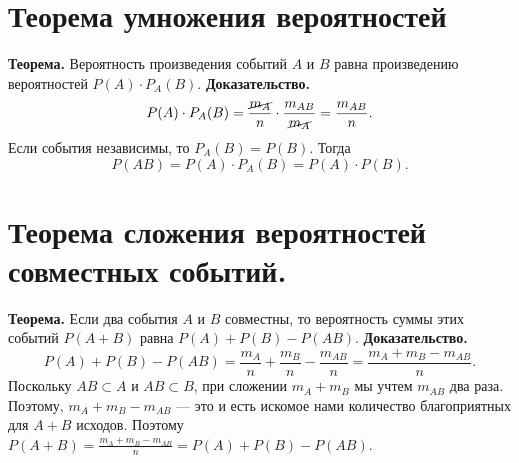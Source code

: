 \documentclass[a4paper,11pt,oneside]{article}
\begin{document}
\section{Теорема умножения вероятностей}
\textbf{Теорема.} Вероятность произведения событий $A$ и $B$ равна произведению вероятностей $P(A) \cdot P_{A}(B)$.\newline
\textbf{Доказательство.}
\[
  P(A) \cdot P_{A}(B) = \frac{\cancel{m_{A}}}{n} \cdot \frac{m_{AB}}{\cancel{m_{A}}} = \frac{m_{AB}}{n}.
\]
Если события независимы, то $P_{A}(B) = P(B)$. Тогда
\[
  P(AB) = P(A) \cdot P_{A}(B) = P(A) \cdot P(B).
\]
\section{Теорема сложения вероятностей совместных событий.}
\textbf{Теорема.} Если два события $A$ и $B$ совместны, то вероятность суммы этих событий $P(A + B)$ равна $P(A) + P(B) - P(AB)$.
\textbf{Доказательство.}
\[
  P(A) + P(B) - P(AB) =
  \frac{m_{A}}{n} + \frac{m_{B}}{n} - \frac{m_{AB}}{n} =
  \frac{m_{A} + m_{B} - m_{AB}}{n}.
\]
Поскольку $AB \subset A$ и $AB \subset B$, при сложении $m_{A} + m_{B}$ мы учтем $m_{AB}$ два раза. Поэтому, $m_{A} + m_{B} - m_{AB}$ --- это и есть искомое нами количество благоприятных для $A + B$ исходов. Поэтому $P(A+B) = \frac{m_{A} + m_{B} - m_{AB}}{n} = P(A) + P(B) - P(AB)$.
\end{document}
